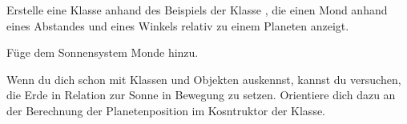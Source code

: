 \documentclass[10pt, a4paper]{arbeitsblatt}
\begin{document}
\begin{aufgabe}
Erstelle eine Klasse  anhand des Beispiels der Klasse ,
die einen Mond anhand eines Abstandes und eines Winkels relativ zu einem Planeten anzeigt.

Füge dem Sonnensystem Monde hinzu.
\end{aufgabe}

\begin{aufgabe*}
Wenn du dich schon mit Klassen und Objekten auskennst, kannst du versuchen, die Erde in Relation zur Sonne in Bewegung zu setzen. Orientiere dich dazu an der Berechnung der Planetenposition im Kosntruktor der Klasse.
\end{aufgabe*}
\end{document}

